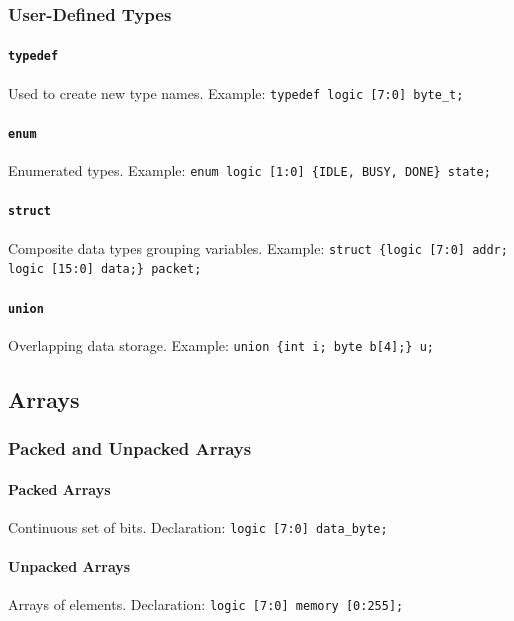 \subsubsection{User-Defined Types}
\paragraph{\texttt{typedef}} Used to create new type names. Example: \texttt{typedef logic [7:0] byte\_t;}

\paragraph{\texttt{enum}} Enumerated types. Example: \texttt{enum logic [1:0] \{IDLE, BUSY, DONE\} state;}

\paragraph{\texttt{struct}} Composite data types grouping variables. Example: \texttt{struct \{logic [7:0] addr; logic [15:0] data;\} packet;}

\paragraph{\texttt{union}} Overlapping data storage. Example: \texttt{union \{int i; byte b[4];\} u;}

\subsection{Arrays}
\subsubsection{Packed and Unpacked Arrays}

\paragraph{\textbf{Packed Arrays}} Continuous set of bits. Declaration: \texttt{logic [7:0] data\_byte;}

\paragraph{\textbf{Unpacked Arrays}} Arrays of elements. Declaration: \texttt{logic [7:0] memory [0:255];}

